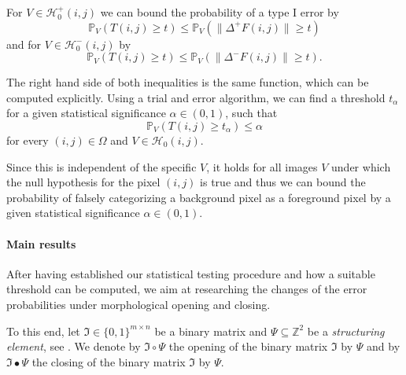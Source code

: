 \documentclass[a4paper,12pt]{article}
\newcommand{\norm}[1]{\lVert#1\rVert}
\theoremstyle{plain}
\theoremstyle{definition}
\begin{document}
For $V \in \mathcal{H}_0^+(i, j)$ we can bound the probability of a type I error by
\begin{equation*}
	\mathbb{P}_V( T(i, j) \geq t ) \leq \mathbb{P}_V( \norm{\Delta^+ F(i, j)} \geq t )
\end{equation*}
and for $V \in \mathcal{H}_0^-(i, j)$ by
\begin{equation*}
	\mathbb{P}_V( T(i, j) \geq t ) \leq \mathbb{P}_V( \norm{\Delta^- F(i, j)} \geq t ).
\end{equation*}

The right hand side of both inequalities is the same function, which can be computed explicitly. Using a trial and error algorithm, we can find a threshold $t_\alpha$ for a given statistical significance $\alpha \in ( 0, 1 )$, such that
\begin{equation*}
	\mathbb{P}_V( T(i, j) \geq t_\alpha ) \leq \alpha
\end{equation*}
for every $(i, j) \in \Omega$ and $V \in \mathcal{H}_0(i, j)$.

Since this is independent of the specific $V$, it holds for all images $V$ under which the null hypothesis for the pixel $(i, j)$ is true and thus we can bound the probability of falsely categorizing a background pixel as a foreground pixel by a given statistical significance $\alpha \in ( 0, 1 )$.

\paragraph{Main results}

After having established our statistical testing procedure and how a suitable threshold can be computed, we aim at researching the changes of the error probabilities under morphological opening and closing.

To this end, let $\mathfrak{I} \in \{ 0, 1 \}^{m \times n}$ be a binary matrix and $\Psi \subseteq \mathbb{Z}^2$ be a \emph{structuring element}, see \cite{imageprocessing}. We denote by $\mathfrak{I} \circ \Psi$ the opening of the binary matrix $\mathfrak{I}$ by $\Psi$ and by $\mathfrak{I} \bullet \Psi$ the closing of the binary matrix $\mathfrak{I}$ by $\Psi$.
\end{document}
